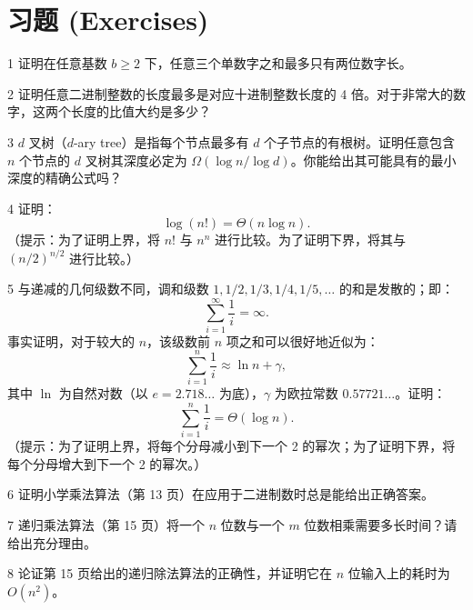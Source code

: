 \newpage
\section*{习题 (Exercises)}

\begin{exercise}{1}
证明在任意基数 $b \ge 2$ 下，任意三个单数字之和最多只有两位数字长。
\end{exercise}

\begin{exercise}{2}
证明任意二进制整数的长度最多是对应十进制整数长度的 4 倍。对于非常大的数字，这两个长度的比值大约是多少？
\end{exercise}

\begin{exercise}{3}
$d$ 叉树（$d$-ary tree）是指每个节点最多有 $d$ 个子节点的有根树。证明任意包含 $n$ 个节点的 $d$ 叉树其深度必定为 $\Omega(\log n / \log d)$。你能给出其可能具有的最小深度的精确公式吗？
\end{exercise}

\begin{exercise}{4}
证明：
\[
\log(n!) = \Theta(n \log n).
\]
（提示：为了证明上界，将 $n!$ 与 $n^n$ 进行比较。为了证明下界，将其与 $(n/2)^{n/2}$ 进行比较。）
\end{exercise}

\begin{exercise}{5}
与递减的几何级数不同，调和级数 $1, 1/2, 1/3, 1/4, 1/5, \dots$ 的和是发散的；即：
\[
\sum_{i=1}^\infty \frac{1}{i} = \infty.
\]
事实证明，对于较大的 $n$，该级数前 $n$ 项之和可以很好地近似为：
\[
\sum_{i=1}^n \frac{1}{i} \approx \ln n + \gamma,
\]
其中 $\ln$ 为自然对数（以 $e = 2.718\dots$ 为底），$\gamma$ 为欧拉常数 $0.57721\dots$。证明：
\[
\sum_{i=1}^n \frac{1}{i} = \Theta(\log n).
\]
（提示：为了证明上界，将每个分母减小到下一个 2 的幂次；为了证明下界，将每个分母增大到下一个 2 的幂次。）
\end{exercise}

\begin{exercise}{6}
证明小学乘法算法（第 13 页）在应用于二进制数时总是能给出正确答案。
\end{exercise}

\begin{exercise}{7}
递归乘法算法（第 15 页）将一个 $n$ 位数与一个 $m$ 位数相乘需要多长时间？请给出充分理由。
\end{exercise}

\begin{exercise}{8}
论证第 15 页给出的递归除法算法的正确性，并证明它在 $n$ 位输入上的耗时为 $O(n^2)$。
\end{exercise}

